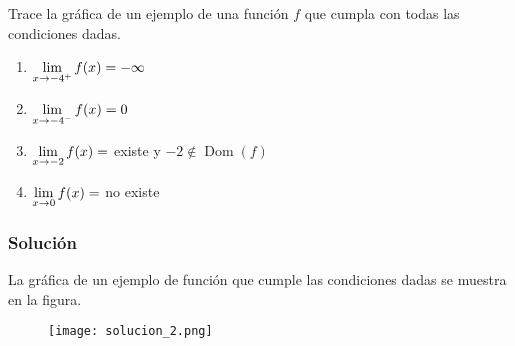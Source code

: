 Trace la gráfica de un ejemplo de una función $f$ que cumpla con todas las condiciones dadas.

\begin{enumerate}[label=\alph*)]
  \item $\displaystyle\lim _{x \rightarrow-4^{+}} f(x)=-\infty$
  \item $\displaystyle\lim _{x \rightarrow-4^{-}} f(x)=0$
  \item $\displaystyle\lim _{x \rightarrow-2} f(x)=$ existe y $-2 \notin \operatorname{Dom}(f)$
  \item $\displaystyle\lim _{x \rightarrow 0} f(x)=$ no existe
\end{enumerate}

\begin{soluciones}
  \subsubsection*{Solución}

  La gráfica de un ejemplo de función que cumple las condiciones dadas se muestra en la figura.

  \begin{figure}[H]
    \centering
    \texttt{[image: solucion\_2.png]}
    \label{fig:solucion_2}
  \end{figure}
\end{soluciones}
